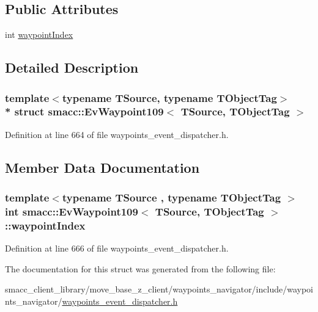 \subsection*{Public Attributes}
\begin{DoxyCompactItemize}
\item 
int \hyperlink{structsmacc_1_1EvWaypoint109_a6e9d3ddbc1007ad761b62dceb99c3612}{waypoint\+Index}
\end{DoxyCompactItemize}


\subsection{Detailed Description}
\subsubsection*{template$<$typename T\+Source, typename T\+Object\+Tag$>$\\*
struct smacc\+::\+Ev\+Waypoint109$<$ T\+Source, T\+Object\+Tag $>$}



Definition at line 664 of file waypoints\+\_\+event\+\_\+dispatcher.\+h.



\subsection{Member Data Documentation}
\subsubsection[{\texorpdfstring{waypoint\+Index}{waypointIndex}}]{\setlength{\rightskip}{0pt plus 5cm}template$<$typename T\+Source , typename T\+Object\+Tag $>$ int {\bf smacc\+::\+Ev\+Waypoint109}$<$ T\+Source, T\+Object\+Tag $>$\+::waypoint\+Index}\hypertarget{structsmacc_1_1EvWaypoint109_a6e9d3ddbc1007ad761b62dceb99c3612}{}\label{structsmacc_1_1EvWaypoint109_a6e9d3ddbc1007ad761b62dceb99c3612}


Definition at line 666 of file waypoints\+\_\+event\+\_\+dispatcher.\+h.



The documentation for this struct was generated from the following file\+:\begin{DoxyCompactItemize}
\item 
smacc\+\_\+client\+\_\+library/move\+\_\+base\+\_\+z\+\_\+client/waypoints\+\_\+navigator/include/waypoints\+\_\+navigator/\hyperlink{waypoints__event__dispatcher_8h}{waypoints\+\_\+event\+\_\+dispatcher.\+h}\end{DoxyCompactItemize}
